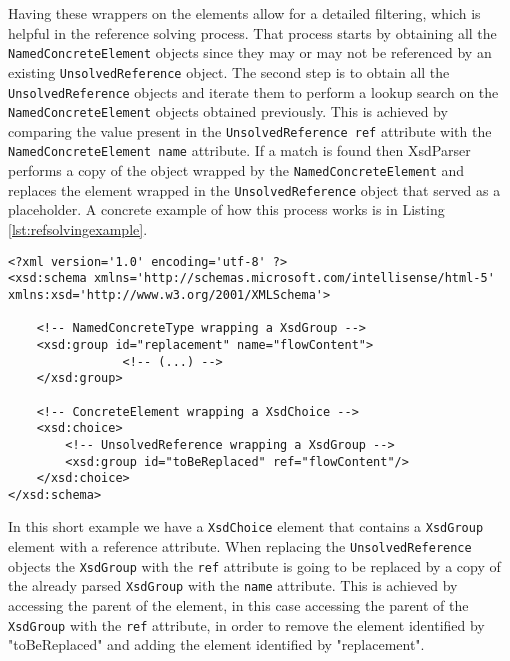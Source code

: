 \noindent
Having these wrappers on the elements allow for a detailed filtering, which is helpful in the reference solving process. That process starts by obtaining all the \texttt{NamedConcreteElement} objects since they may or may not be referenced by an existing \texttt{UnsolvedReference} object. The second step is to obtain all the \texttt{UnsolvedReference} objects and iterate them to perform a lookup search on the \texttt{NamedConcreteElement} objects obtained previously. This is achieved by comparing the value present in the \texttt{UnsolvedReference ref} attribute with the \texttt{NamedConcreteElement name} attribute. If a match is found then XsdParser performs a copy of the object wrapped by the \texttt{NamedConcreteElement} and replaces the element wrapped in the \texttt{UnsolvedReference} object that served as a placeholder. A concrete example of how this process works is in Listing \ref{lst:refsolvingexample}.

\bigskip


\begin{minipage}{\linewidth}
\begin{lstlisting}[caption={Reference Solving Example},captionpos=b,label={lst:refsolvingexample}]
<?xml version='1.0' encoding='utf-8' ?>
<xsd:schema xmlns='http://schemas.microsoft.com/intellisense/html-5' xmlns:xsd='http://www.w3.org/2001/XMLSchema'>
	
    <!-- NamedConcreteType wrapping a XsdGroup -->
    <xsd:group id="replacement" name="flowContent">
				<!-- (...) -->
    </xsd:group>
	
    <!-- ConcreteElement wrapping a XsdChoice -->
    <xsd:choice>
        <!-- UnsolvedReference wrapping a XsdGroup -->
        <xsd:group id="toBeReplaced" ref="flowContent"/>
    </xsd:choice>
</xsd:schema>
\end{lstlisting}
\end{minipage}

\noindent
In this short example we have a \texttt{XsdChoice} element that contains a \texttt{XsdGroup} element with a reference attribute. When replacing the \texttt{UnsolvedReference} objects the \texttt{XsdGroup} with the \texttt{ref} attribute is going to be replaced by a copy of the already parsed \texttt{XsdGroup} with the \texttt{name} attribute. This is achieved by accessing the parent of the element, in this case accessing the parent of the \texttt{XsdGroup} with the \texttt{ref} attribute, in order to remove the element identified by "toBeReplaced" and adding the element identified by "replacement".

